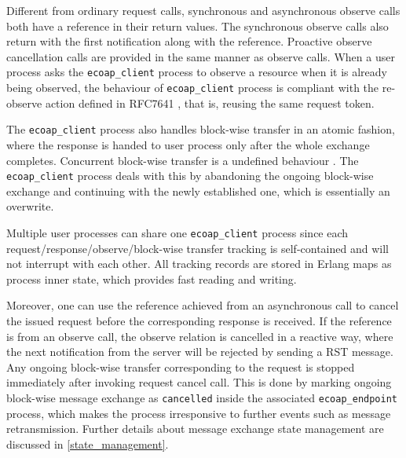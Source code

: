 \begin{itemize}
Different from ordinary request calls, synchronous and asynchronous observe calls both have a reference in their return values. The synchronous observe calls also return with the first notification along with the reference. Proactive observe cancellation calls are provided in the same manner as observe calls. When a user process asks the \verb|ecoap_client| process to observe a resource when it is already being observed, the behaviour of \verb|ecoap_client| process is compliant with the re-observe action defined in RFC7641 \cite{coap_observe}, that is, reusing the same request token.

The \verb|ecoap_client| process also handles block-wise transfer in an atomic fashion, where the response is handed to user process only after the whole exchange completes. Concurrent block-wise transfer is a undefined behaviour \cite{blockwise}. The \verb|ecoap_client| process deals with this by abandoning the ongoing block-wise exchange and continuing with the newly established one, which is essentially an overwrite. 

Multiple user processes can share one \verb|ecoap_client| process since each request/response/observe/block-wise transfer tracking is self-contained and will not interrupt with each other. All tracking records are stored in Erlang maps as process inner state, which provides fast reading and writing.

Moreover, one can use the reference achieved from an asynchronous call to cancel the issued request before the corresponding response is received. If the reference is from an observe call, the observe relation is cancelled in a reactive way, where the next notification from the server will be rejected by sending a RST message. Any ongoing block-wise transfer corresponding to the request is stopped immediately after invoking request cancel call. This is done by marking ongoing block-wise message exchange as \verb|cancelled| inside the associated \verb|ecoap_endpoint| process, which makes the process irresponsive to further events such as message retransmission. Further details about message exchange state management are discussed in \ref{state_management}.


\end{itemize}
